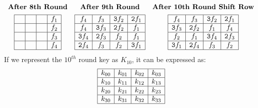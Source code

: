 \documentclass{beamer}
\newenvironment{tres important}[2][]{
	\setkeys{EmphEqEnv}{#2}
	\setkeys{EmphEqOpt}{box={\setlength{\fboxsep}{10pt}\fcolorbox{myNewColorA}{white}},#1}
	\EmphEqMainEnv}
{\endEmphEqMainEnv}
\begin{document}
\begin{frame}[fragile]
\scriptsize
\[
\begin{array}{ccc}
    \textbf{After 8th Round} & \textbf{After 9th Round} & \textbf{After 10th Round Shift Row} \\[1ex]
    \begin{array}{|c|c|c|c|}
        \hline
        \texttt{ } & \texttt{ } & \texttt{ } & \texttt{$f_1$} \\
        \hline
        \texttt{ } & \texttt{ } & \texttt{ } & \texttt{$f_2$} \\
        \hline
        \texttt{ } & \texttt{ } & \texttt{ } & \texttt{$f_3$} \\
        \hline
        \texttt{ } & \texttt{ } & \texttt{ } & \texttt{$f_4$} \\
        \hline
    \end{array}
    &

    \begin{array}{|c|c|c|c|}
        \hline
        \texttt{$f_4$} & \texttt{$f_3$} & \texttt{3$f_2$} & \texttt{2$f_1$} \\
        \hline
        \texttt{$f_4$} & \texttt{3$f_3$} & \texttt{2$f_2$} & \texttt{$f_1$} \\
        \hline
        \texttt{3$f_4$} & \texttt{2$f_3$} & \texttt{$f_2$} & \texttt{$f_1$} \\
        \hline
        \texttt{2$f_4$} & \texttt{$f_3$} & \texttt{$f_2$} & \texttt{3$f_1$} \\
        \hline
    \end{array}
    &

    \begin{array}{|c|c|c|c|}
        \hline
        \texttt{$f_4$} & \texttt{$f_3$} & \texttt{3$f_2$} & \texttt{2$f_1$} \\
        \hline
        \texttt{3$f_3$} & \texttt{2$f_2$} & \texttt{$f_1$} & \texttt{$f_4$} \\
        \hline
        \texttt{$f_2$} & \texttt{$f_1$} & \texttt{3$f_4$} & \texttt{2$f_3$} \\
        \hline
        \texttt{3$f_1$} & \texttt{2$f_4$} & \texttt{$f_3$} & \texttt{$f_2$} \\
        \hline
    \end{array}
\end{array}
\]
If we represent the $10^{th}$ round key as \(K_{10}\), it can be expressed as:
\[
    \begin{array}{|c|c|c|c|}
        \hline
        k_{00} & k_{01} & k_{02} & k_{03} \\
        \hline
        k_{10} & k_{11} & k_{12} & k_{13} \\
        \hline
        k_{20} & k_{21} & k_{22} & k_{23} \\
        \hline
        k_{30} & k_{31} & k_{32} & k_{33} \\
        \hline
        \end{array}
\]
\end{frame}
\end{document}
